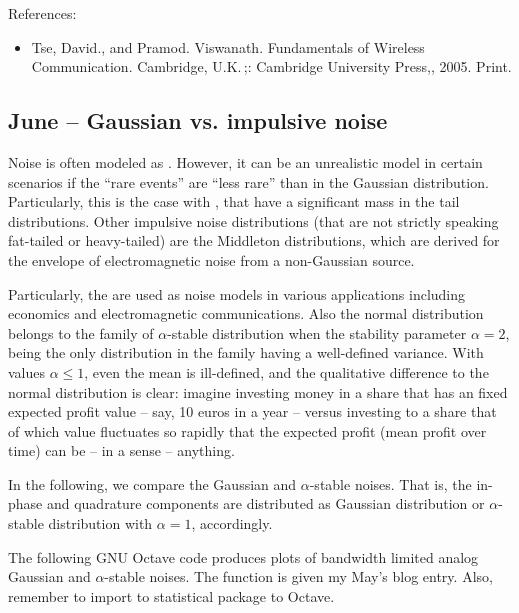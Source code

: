 \documentclass{article}
\begin{document}
References:
\begin{itemize}
\item 
  Tse, David., and Pramod. Viswanath. Fundamentals of Wireless Communication. Cambridge, U.K. ;: Cambridge University Press,, 2005. Print.

\end{itemize}

\subsection{June – Gaussian vs. impulsive noise}

Noise is often modeled as . However, it can be an unrealistic model in certain scenarios if the ``rare events'' are ``less rare'' than in the Gaussian distribution. Particularly, this is the case with , that have a significant mass in the tail distributions. Other impulsive noise distributions (that are not strictly speaking fat-tailed or heavy-tailed) are the Middleton distributions, which are derived for the envelope of electromagnetic noise from a non-Gaussian source.

Particularly, the  are used as noise models in various applications including economics and electromagnetic communications. Also the normal distribution belongs to the family of $\alpha$-stable distribution when the stability parameter $\alpha = 2$, being the only distribution in the family having a well-defined variance. With values $\alpha \leq 1$, even the mean is ill-defined, and the qualitative difference to the normal distribution is clear: imagine investing money in a share that has an fixed expected profit value – say, 10 euros in a year – versus investing to a share that of which value fluctuates so rapidly that the expected profit (mean profit over time) can be – in a sense – anything.

In the following, we compare the Gaussian and $\alpha$-stable noises. That is, the in-phase and quadrature components are distributed as Gaussian distribution or $\alpha$-stable distribution with $\alpha =1$, accordingly. 


The following GNU Octave code produces plots of bandwidth limited analog Gaussian and  $\alpha$-stable noises. The function  is given my May's blog entry. Also, remember to import to statistical package to Octave.
\end{document}
